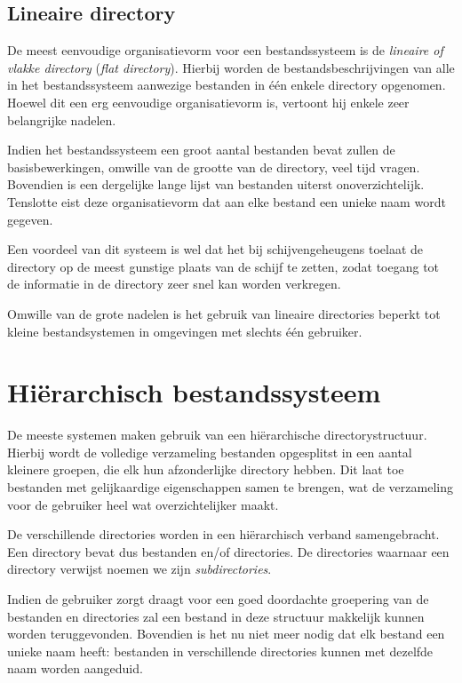 \subsection{Lineaire directory}

De meest eenvoudige organisatievorm voor een bestandssysteem is
de \emph{lineaire of vlakke directory}
(\emph{flat directory}). Hierbij worden de
bestandsbeschrijvingen van alle in het bestandssysteem aanwezige
bestanden in \'e\'en enkele directory opgenomen. Hoewel dit een erg
eenvoudige organisatievorm is, vertoont hij enkele zeer belangrijke
nadelen.

Indien het bestandssysteem een groot aantal bestanden bevat
zullen de basisbewerkingen, omwille van de grootte van de directory,
veel tijd vragen. Bovendien is een dergelijke lange lijst van
bestanden uiterst onoverzichtelijk. Tenslotte eist deze
organisatievorm dat aan elke bestand een unieke naam wordt
gegeven.

Een voordeel van dit systeem is wel dat het bij
schijvengeheugens toelaat de directory op de meest gunstige plaats van
de schijf te zetten, zodat toegang tot de informatie in de directory
zeer snel kan worden verkregen.

Omwille van de grote nadelen is het gebruik van lineaire
directories beperkt tot kleine bestandsystemen in omgevingen met
slechts \'e\'en gebruiker.

\section{Hi\"erarchisch bestandssysteem}

De meeste systemen maken gebruik van een hi\"erarchische
directorystructuur. Hierbij wordt de volledige verzameling bestanden
opgesplitst in een aantal kleinere groepen, die elk hun afzonderlijke
directory hebben. Dit laat toe bestanden met gelijkaardige
eigenschappen samen te brengen, wat de verzameling voor de gebruiker
heel wat overzichtelijker maakt.

De verschillende directories worden in een hi\"erarchisch verband
samengebracht. Een directory bevat dus bestanden en/of directories. De
directories waarnaar een directory verwijst noemen we zijn
\emph{subdirectories}.

Indien de gebruiker zorgt draagt voor een goed doordachte
groepering van de bestanden en directories zal een bestand in deze
structuur makkelijk kunnen worden teruggevonden. Bovendien is het nu
niet meer nodig dat elk bestand een unieke naam heeft: bestanden in
verschillende directories kunnen met dezelfde naam worden
aangeduid.

